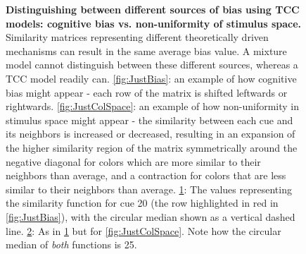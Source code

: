 \begin{figure}
    \begin{subfigure}[b]{0.49\textwidth}
         \centering
         \caption{}
         
         \label{fig:JustBias_subset}
    \end{subfigure}
    \hfill
    \begin{subfigure}[b]{0.49\textwidth}
         \centering
         \caption{}
         
         \label{fig:JustColSpace_subset}
    \end{subfigure}
        \caption{\textbf{Distinguishing between different sources of bias using TCC models: cognitive bias vs. non-uniformity of stimulus space.} Similarity matrices representing different theoretically driven mechanisms can result in the same average bias value. A mixture model cannot distinguish between these different sources, whereas a TCC model readily can. \ref{fig:JustBias}: an example of how cognitive bias might appear - each row of the matrix is shifted leftwards or rightwards. \ref{fig:JustColSpace}: an example of how non-uniformity in stimulus space might appear - the similarity between each cue and its neighbors is increased or decreased, resulting in an expansion of the higher similarity region of the matrix symmetrically around the negative diagonal for colors which are more similar to their neighbors than average, and a contraction for colors that are less similar to their neighbors than average. \ref{fig:JustBias_subset}: The values representing the similarity function for cue 20 (the row highlighted in red in \ref{fig:JustBias}), with the circular median shown as a vertical dashed line. \ref{fig:JustColSpace_subset}: As in \ref{fig:JustBias_subset} but for \ref{fig:JustColSpace}. Note how the circular median of \emph{both} functions is 25.}
        \label{fig:TCCDemo}
\end{figure}

